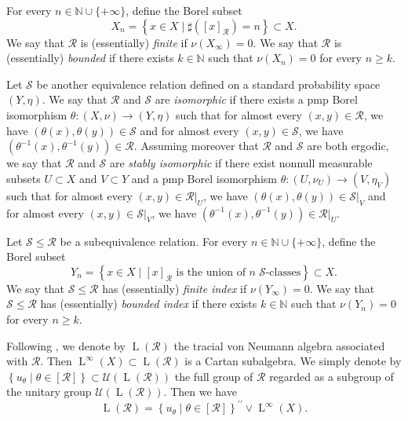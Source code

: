 \documentclass[11pt]{amsart}
\numberwithin{equation}{section}
\theoremstyle{plain}
\theoremstyle{definition}
\newcommand{\N}{\mathbb{N}}
\newcommand{\dpr}{^{\prime\prime}}
\newcommand{\rL}{\operatorname{L}}
\begin{document}
For every $n \in \N \cup \{+\infty\}$, define the Borel subset 
$$X_n = \left \{ x \in X \mid \sharp ([x]_{\mathscr R}) = n \right \} \subset X.$$
We say that $\mathscr R$ is (essentially) {\em finite} if $\nu(X_\infty) = 0$. We say that $\mathscr R$ is (essentially) {\em bounded} if there exists $k \in \N$ such that $\nu(X_n) = 0$ for every $n \geq k$.






Let $\mathscr S$ be another equivalence relation defined on a standard probability space $(Y, \eta)$. We say that $\mathscr R$ and $\mathscr S$ are {\em isomorphic} if there exists a pmp Borel isomorphism $\theta : (X, \nu) \to (Y, \eta)$ such that for almost every $(x, y) \in \mathscr R$, we have $(\theta(x), \theta(y)) \in \mathscr S$ and for almost every $(x, y) \in \mathscr S$, we have $(\theta^{-1}(x), \theta^{-1}(y)) \in \mathscr R$. Assuming moreover that $\mathscr R$ and $\mathscr S$ are both ergodic, we say that $\mathscr R$ and $\mathscr S$ are {\em stably isomorphic} if there exist nonnull measurable subsets $U \subset X$ and $V \subset Y$ and a pmp Borel isomorphism $\theta : (U, \nu_U) \to (V, \eta_V)$ such that for almost every $(x, y) \in \mathscr R|_U$, we have $(\theta(x), \theta(y)) \in \mathscr S|_V$ and for almost every $(x, y) \in \mathscr S|_V$, we have $(\theta^{-1}(x), \theta^{-1}(y)) \in \mathscr R|_U$.


Let $\mathscr S \leq \mathscr R$ be a subequivalence relation. For every $n \in \N \cup \{+\infty\}$, define the Borel subset 
$$Y_n = \left \{ x \in X \mid [x]_{\mathscr R} \text{ is the union of } n \; \mathscr S\text{-classes} \right \} \subset X.$$
We say that $\mathscr S \leq \mathscr R$ has (essentially) {\em finite index} if $\nu(Y_\infty) = 0$. We say that $\mathscr S \leq \mathscr R$ has (essentially) {\em bounded index} if there exists $k \in \N$ such that $\nu(Y_n) = 0$ for every $n \geq k$.


Following \cite{FM75}, we denote by $\rL(\mathscr R)$ the tracial von Neumann algebra associated with $\mathscr R$. Then $\rL^\infty(X) \subset \rL(\mathscr R)$ is a Cartan subalgebra. We simply denote by $\left\{u_\theta \mid \theta \in [\mathscr R] \right\} \subset \mathscr U(\rL(\mathscr R))$ the full group of $\mathscr R$ regarded as a subgroup of the unitary group $\mathscr U(\rL(\mathscr R))$. Then we have 
$$\rL(\mathscr R) = \left\{u_\theta \mid \theta \in [\mathscr R] \right\}\dpr \vee \rL^\infty(X).$$
\end{document}
